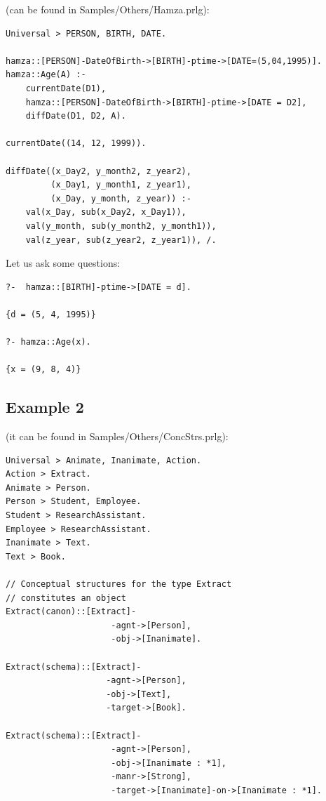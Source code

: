 \documentclass{book}
\begin{document}
(can be found in Samples/Others/Hamza.prlg):


\begin{verbatim}
Universal > PERSON, BIRTH, DATE.

hamza::[PERSON]-DateOfBirth->[BIRTH]-ptime->[DATE=(5,04,1995)].
hamza::Age(A) :-
    currentDate(D1), 
    hamza::[PERSON]-DateOfBirth->[BIRTH]-ptime->[DATE = D2],
    diffDate(D1, D2, A).

currentDate((14, 12, 1999)).

diffDate((x_Day2, y_month2, z_year2), 
         (x_Day1, y_month1, z_year1), 
         (x_Day, y_month, z_year)) :-
    val(x_Day, sub(x_Day2, x_Day1)), 
    val(y_month, sub(y_month2, y_month1)),
    val(z_year, sub(z_year2, z_year1)), /.
\end{verbatim}


Let us ask some questions:


\begin{verbatim}
?-  hamza::[BIRTH]-ptime->[DATE = d].
 
{d = (5, 4, 1995)}

?- hamza::Age(x).
 
{x = (9, 8, 4)}
\end{verbatim}



\subsection{Example 2}

(it can be found in Samples/Others/ConcStrs.prlg):


\begin{verbatim}
Universal > Animate, Inanimate, Action.
Action > Extract.
Animate > Person.
Person > Student, Employee.
Student > ResearchAssistant.
Employee > ResearchAssistant.
Inanimate > Text.
Text > Book.

// Conceptual structures for the type Extract 
// constitutes an object
Extract(canon)::[Extract]-
                     -agnt->[Person], 
                     -obj->[Inanimate].

Extract(schema)::[Extract]-
                    -agnt->[Person], 
                    -obj->[Text],
                    -target->[Book].

Extract(schema)::[Extract]-
                     -agnt->[Person], 
                     -obj->[Inanimate : *1],
                     -manr->[Strong],
                     -target->[Inanimate]-on->[Inanimate : *1].
\end{verbatim}
\end{document}
